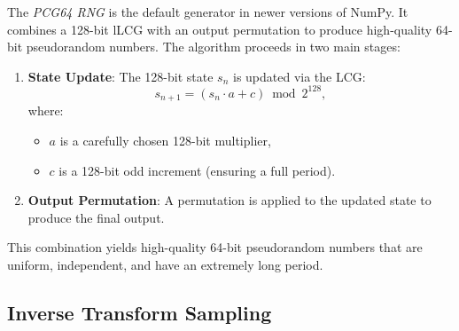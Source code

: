 \documentclass[10pt, headings=standardclasses, parskip=half, twoside]{scrartcl}
\begin{document}
\begin{example}
    The \textit{PCG64 RNG} is the default generator in newer versions of NumPy. 
    It combines a 128-bit lLCG with an output permutation to produce high-quality 64-bit pseudorandom numbers. 
    The algorithm proceeds in two main stages:
    \begin{enumerate}
        \item \textbf{State Update}: The 128-bit state $s_{n}$ is updated via the LCG:
        \[
        s_{n+1}=\left(s_{n} \cdot a+c\right) \bmod 2^{128},
        \]
        where:
        \begin{itemize}[before={\parskip=0pt}, nosep]
            \item $a$ is a carefully chosen 128-bit multiplier,
            \item $c$ is a 128-bit odd increment (ensuring a full period).
        \end{itemize}
        \item \textbf{Output Permutation}: A permutation is applied to the updated state to produce the final output.
    \end{enumerate}
    This combination yields high-quality 64-bit pseudorandom numbers that are uniform, independent, and have an extremely long period. 
\end{example}




\subsection{Inverse Transform Sampling}
\end{document}
